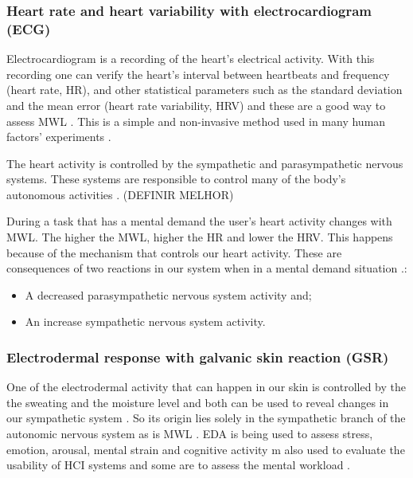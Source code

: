         \subsubsection{Heart rate and heart variability with electrocardiogram (ECG)}
        \label{subsubsec:ecg}
        
            Electrocardiogram is a recording of the heart's electrical activity. With this recording one can verify the heart's interval between heartbeats and frequency (heart rate, HR), and other statistical parameters such as the standard deviation and the mean error (heart rate variability, HRV) and these are a good way to assess MWL \cite{cain2007review}. This is a simple and non-invasive method used in many human factors' experiments \cite{mohanavelu2020cognitive, mansikka2016fighter, zhang2014detection}.
        
            The heart activity is controlled by the sympathetic and parasympathetic nervous systems. These systems are responsible to control many of the body's autonomous activities \cite{stanton2004handbook}. (DEFINIR MELHOR)
        
            During a task that has a mental demand the user's heart activity changes with MWL. The higher the MWL, higher the HR and lower the HRV. This happens because of the mechanism that controls our heart activity. These are consequences of two reactions in our system when in a mental demand situation \cite{stanton2004handbook}.:
            
            \begin{itemize}
                \item A decreased parasympathetic nervous system activity and;
                \item An increase sympathetic nervous system activity.
            \end{itemize}
    
        \subsubsection{Electrodermal response with galvanic skin reaction (GSR)}
        \label{subsubsec:gsr}
        
        One of the electrodermal activity that can happen in our skin is controlled by the the sweating and the moisture level and both can be used to reveal changes in our sympathetic system \cite{nourbakhsh2012using, shi2007galvanic}. So its origin lies solely in the sympathetic branch of the autonomic nervous system as is MWL \cite{stanton2004handbook}. EDA is being used to assess stress, emotion, arousal, mental strain and cognitive activity \cite{nourbakhsh2012using, stanton2004handbook, shi2007galvanic}m also used to evaluate the usability of HCI systems \cite{shi2007galvanic} and some are to assess the mental workload \cite{zhang2014detection, borghini2014measuring}.
    
